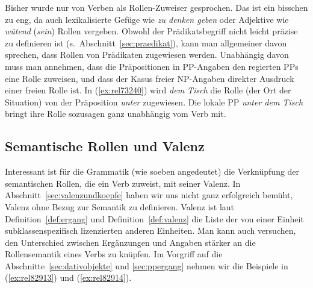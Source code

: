 Bisher wurde nur von Verben als Rollen-Zuweiser gesprochen.
Das ist ein bisschen zu eng, da auch lexikalisierte Gefüge wie \textit{zu denken geben} oder Adjektive wie \textit{wütend} (\textit{sein}) Rollen vergeben.
Obwohl der Prädikatsbegriff nicht leicht präzise zu definieren ist (s.\ Abschnitt~\ref{sec:praedikat}), kann man allgemeiner davon sprechen, dass Rollen von Prädikaten zugewiesen werden.
Unabhängig davon muss man annehmen, dass die Präpositionen in PP-Angaben den regierten PPs eine Rolle zuweisen, und dass der Kasus freier NP-Angaben direkter Ausdruck einer freien Rolle ist.
In (\ref{ex:rel73240}) wird \textit{dem Tisch} die Rolle (der Ort der Situation) von der Präposition \textit{unter} zugewiesen.
Die lokale PP \textit{unter dem Tisch} bringt ihre Rolle sozusagen ganz unabhängig vom Verb mit.

\begin{exe}
\end{exe}

\subsection{Semantische Rollen und Valenz}


Interessant ist für die Grammatik (wie soeben angedeutet) die Verknüpfung der semantischen Rollen, die ein Verb zuweist, mit seiner Valenz.
In Abschnitt~\ref{sec:valenzundkoepfe} haben wir uns nicht ganz erfolgreich bemüht, Valenz ohne Bezug zur Semantik zu definieren.
Valenz ist laut Definition~\ref{def:ergang} und Definition~\ref{def:valenz} die Liste der von einer Einheit subklassenspezifisch lizenzierten anderen Einheiten.
Man kann auch versuchen, den Unterschied zwischen Ergänzungen und Angaben stärker an die Rollensemantik eines Verbs zu knüpfen.
Im Vorgriff auf die Abschnitte~\ref{sec:dativobjekte} und \ref{sec:ppergang} nehmen wir die Beispiele in (\ref{ex:rel82913}) und (\ref{ex:rel82914}).

\begin{exe}
  \ex\label{ex:rel82913} 
  \begin{xlist}
  \end{xlist}
  \ex\label{ex:rel82914} 
  \begin{xlist}
  \end{xlist}
\end{exe}

